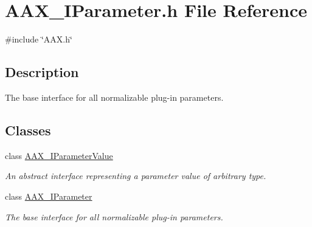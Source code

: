 \hypertarget{a00623}{}\section{A\+A\+X\+\_\+\+I\+Parameter.\+h File Reference}
\label{a00623}
{\ttfamily \#include \char`\"{}A\+A\+X.\+h\char`\"{}}\newline


\subsection{Description}
The base interface for all normalizable plug-\/in parameters. 

\subsection*{Classes}
\begin{DoxyCompactItemize}
\item 
class \mbox{\hyperlink{a01853}{A\+A\+X\+\_\+\+I\+Parameter\+Value}}
\begin{DoxyCompactList}\small\item\em An abstract interface representing a parameter value of arbitrary type. \end{DoxyCompactList}\item 
class \mbox{\hyperlink{a01857}{A\+A\+X\+\_\+\+I\+Parameter}}
\begin{DoxyCompactList}\small\item\em The base interface for all normalizable plug-\/in parameters. \end{DoxyCompactList}\end{DoxyCompactItemize}
